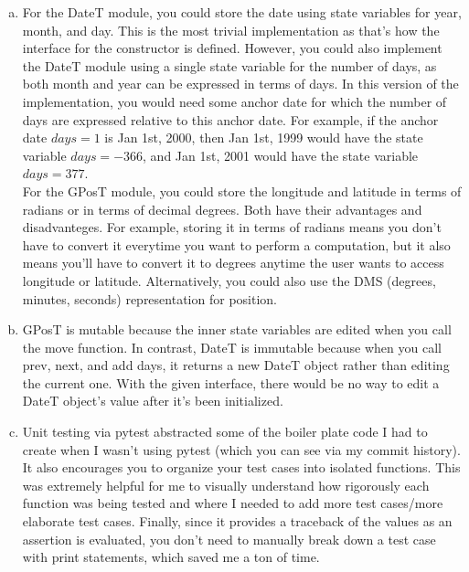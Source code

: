 \documentclass[12pt]{article}
\begin{document}
\begin{enumerate}[(a)]

\item For the DateT module, you could store the date using state variables for year, month, and day. This is the most trivial implementation as that's how the interface for the constructor is defined. However, you could also implement the DateT module using a single state variable for the number of days, as both month and year can be expressed in terms of days. In this version of the implementation, you would need some anchor date for which the number of days are expressed relative to this anchor date. For example, if the anchor date $days=1$ is Jan 1st, 2000, then Jan 1st, 1999 would have the state variable $days=-366$, and Jan 1st, 2001 would have the state variable $days=377$. \\ For the GPosT module, you could store the longitude and latitude in terms of radians or in terms of decimal degrees. Both have their advantages and disadvanteges. For example, storing it in terms of radians means you don't have to convert it everytime you want to perform a computation, but it also means you'll have to convert it to degrees anytime the user wants to access longitude or latitude. Alternatively, you could also use the DMS (degrees, minutes, seconds) representation for position.

\item GPosT is mutable because the inner state variables are edited when you call the move function. In contrast, DateT is immutable because when you call prev, next, and add days, it returns a new DateT object rather than editing the current one. With the given interface, there would be no way to edit a DateT object's value after it's been initialized.

\item Unit testing via pytest abstracted some of the boiler plate code I had to create when I wasn't using pytest (which you can see via my commit history). It also encourages you to organize your test cases into isolated functions. This was extremely helpful for me to visually understand how rigorously each function was being tested and where I needed to add more test cases/more elaborate test cases. Finally, since it provides a traceback of the values as an assertion is evaluated, you don't need to manually break down a test case with print statements, which saved me a ton of time.


\end{enumerate}
\end{document}

